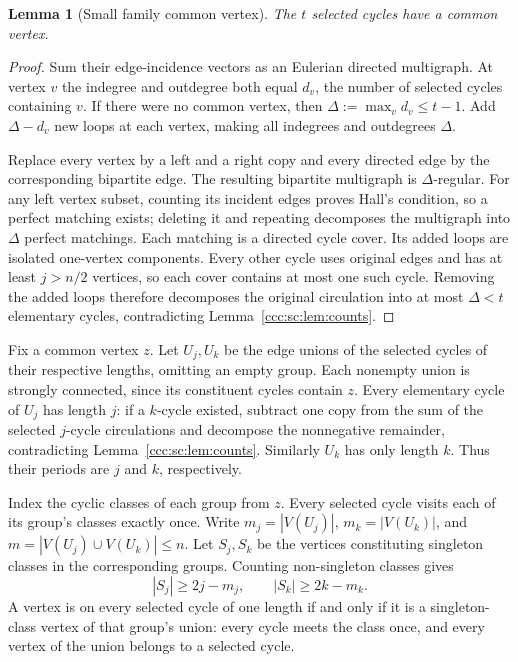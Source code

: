 \documentclass[11pt,letterpaper]{article}
\newtheorem{lemma}[theorem]{Lemma}
\theoremstyle{definition}
\theoremstyle{remark}
\begin{document}
\begin{lemma}[Small family common vertex]\label{ccc:sc:lem:common-vertex}
The $t$ selected cycles have a common vertex.
\end{lemma}
\begin{proof}
Sum their edge-incidence vectors as an Eulerian directed multigraph. At vertex $v$ the indegree and outdegree both equal $d_v$, the number of selected cycles containing $v$. If there were no common vertex, then $\Delta:=\max_v d_v\le t-1$. Add $\Delta-d_v$ new loops at each vertex, making all indegrees and outdegrees $\Delta$.

Replace every vertex by a left and a right copy and every directed edge by the corresponding bipartite edge. The resulting bipartite multigraph is $\Delta$-regular. For any left vertex subset, counting its incident edges proves Hall's condition, so a perfect matching exists; deleting it and repeating decomposes the multigraph into $\Delta$ perfect matchings. Each matching is a directed cycle cover. Its added loops are isolated one-vertex components. Every other cycle uses original edges and has at least $j>n/2$ vertices, so each cover contains at most one such cycle. Removing the added loops therefore decomposes the original circulation into at most $\Delta<t$ elementary cycles, contradicting Lemma~\ref{ccc:sc:lem:counts}.
\end{proof}

Fix a common vertex $z$. Let $U_j,U_k$ be the edge unions of the selected cycles of their respective lengths, omitting an empty group. Each nonempty union is strongly connected, since its constituent cycles contain $z$. Every elementary cycle of $U_j$ has length $j$: if a $k$-cycle existed, subtract one copy from the sum of the selected $j$-cycle circulations and decompose the nonnegative remainder, contradicting Lemma~\ref{ccc:sc:lem:counts}. Similarly $U_k$ has only length $k$. Thus their periods are $j$ and $k$, respectively.

Index the cyclic classes of each group from $z$. Every selected cycle visits each of its group's classes exactly once. Write $m_j=|V(U_j)|$, $m_k=|V(U_k)|$, and $m=|V(U_j)\cup V(U_k)|\le n$. Let $S_j,S_k$ be the vertices constituting singleton classes in the corresponding groups. Counting non-singleton classes gives
\begin{equation}\label{ccc:sc:eq:singleton-anchors}
 |S_j|\ge2j-m_j,\qquad |S_k|\ge2k-m_k.
\end{equation}
A vertex is on every selected cycle of one length if and only if it is a singleton-class vertex of that group's union: every cycle meets the class once, and every vertex of the union belongs to a selected cycle.
\end{document}
